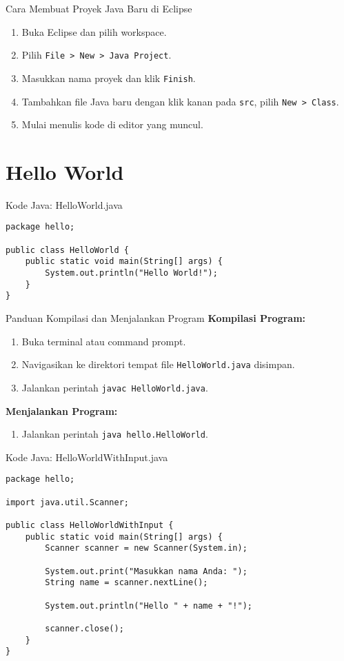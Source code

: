\documentclass[aspectratio=169, table]{beamer}
\begin{document}
\begin{frame}[fragile]{Cara Membuat Proyek Java Baru di Eclipse}
\begin{enumerate}
\item Buka Eclipse dan pilih workspace.
\item Pilih \texttt{File > New > Java Project}.
\item Masukkan nama proyek dan klik \texttt{Finish}.
\item Tambahkan file Java baru dengan klik kanan pada \texttt{src}, pilih \texttt{New > Class}.
\item Mulai menulis kode di editor yang muncul.
\end{enumerate}
\end{frame}

\section{Hello World}
\begin{frame}[fragile]{Kode Java: HelloWorld.java}
\begin{lstlisting}[style=JavaStyle]
package hello;

public class HelloWorld {
	public static void main(String[] args) {
		System.out.println("Hello World!");
	}
}
\end{lstlisting}
\end{frame}

\begin{frame}[fragile]{\LARGE{Panduan Kompilasi dan Menjalankan Program}}
\textbf{Kompilasi Program:}
\begin{enumerate}
\item Buka terminal atau command prompt.
\item Navigasikan ke direktori tempat file \texttt{HelloWorld.java} disimpan.
\item Jalankan perintah \texttt{javac HelloWorld.java}.
\end{enumerate}

\textbf{Menjalankan Program:}
\begin{enumerate}
\item Jalankan perintah \texttt{java hello.HelloWorld}.
\end{enumerate}
\end{frame}

\begin{frame}[fragile]{Kode Java: HelloWorldWithInput.java}
\begin{lstlisting}[style=JavaStyle]
package hello;

import java.util.Scanner;

public class HelloWorldWithInput {
	public static void main(String[] args) {
		Scanner scanner = new Scanner(System.in);
		
		System.out.print("Masukkan nama Anda: ");
		String name = scanner.nextLine();
		
		System.out.println("Hello " + name + "!");
		
		scanner.close();
	}
}
\end{lstlisting}
\end{frame}
\end{document}
